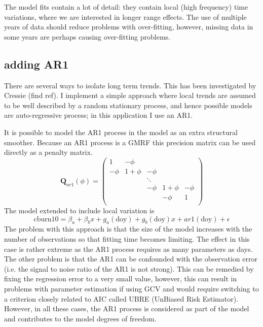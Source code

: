 The model fits contain a lot of detail: they contain local (high frequency) time variations, where we are interested in longer range effects.  The use of multiple years of data should reduce problems with over-fitting, however, missing data in some years are perhaps causing over-fitting problems.





\subsection{adding AR1}

There are several ways to isolate long term trends.  This has been investigated by Cressie (find ref).  I implement a simple approach where local trends are assumed to be well described by a random stationary process, and hence possible models are auto-regressive process; in this application I use an AR1.  

It is possible to model the AR1 process in the model as an extra structural smoother. Because an AR1 process is a GMRF this precision matrix can be used directly as a penalty matrix.
\begin{equation}
\bm{Q}_{ar1}(\phi) = 
\begin{pmatrix} 
1 & -\phi &  &  &  \\ 
 -\phi& 1 + \phi & -\phi &  &  \\ 
 &  & \ddots &  &  \\ 
 &  & -\phi & 1 + \phi & -\phi \\ 
 &  &  & -\phi & 1 \\ 
\end{pmatrix}
\end{equation}
The model extended to include local variation is
\begin{equation}
  \text{cburn10} = \beta_a + \beta_b x + g_a(\text{doy}) + g_b(\text{doy})x + ar1(\text{doy}) + \epsilon
\end{equation}
The problem with this approach is that the size of the model increases with the number of observations so that fitting time becomes limiting.  The effect in this case is rather extreme as the AR1 process requires as many parameters as days.  The other problem is that the AR1 can be confounded with the observation error (i.e. the signal to noise ratio of the AR1 is not strong).  This can be remedied by fixing the regression error to a very small value, however, this can result in problems with parameter estimation if using GCV and would require switching to a criterion closely related to AIC called UBRE (UnBiased Risk Estimator).  However, in all these cases, the AR1 process is considered as part of the model and contributes to the model degrees of freedom.    

